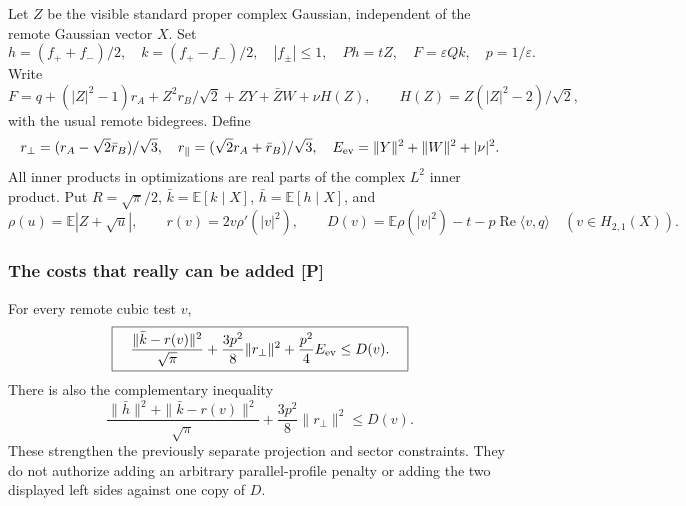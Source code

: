 Let $Z$ be the visible standard proper complex Gaussian, independent of
the remote Gaussian vector $X$. Set
\[
 h=(f_++f_-)/2,\quad k=(f_+-f_-)/2,\quad |f_\pm|\le1,
 \quad Ph=tZ,\quad F=\varepsilon Qk,\quad p=1/\varepsilon.
\]
Write
\[
 F=q+(|Z|^2-1)r_A+Z^2r_B/\sqrt2+ZY+\bar ZW+\nu H(Z),
 \qquad H(Z)=Z(|Z|^2-2)/\sqrt2,
\]
with the usual remote bidegrees. Define
\[
 r_\perp=(r_A-\sqrt2\bar r_B)/\sqrt3,\quad
 r_\parallel=(\sqrt2r_A+\bar r_B)/\sqrt3,\quad
 E_{\rm ev}=\|Y\|^2+\|W\|^2+|\nu|^2.
\]
All inner products in optimizations are real parts of the complex
$L^2$ inner product. Put $R=\sqrt\pi/2$, $\bar k=\mathbb E[k\mid X]$,
$\bar h=\mathbb E[h\mid X]$, and
\[
 \rho(u)=\mathbb E|Z+\sqrt u|,\qquad
 r(v)=2v\rho'(|v|^2),\qquad
 D(v)=\mathbb E\rho(|v|^2)-t-p\operatorname{Re}\langle v,q\rangle
 \quad(v\in H_{2,1}(X)).
\]

\subsubsection{The costs that really can be added [P]}
For every remote cubic test $v$,
\begin{equation}\label{eq:jrb-main}
 \boxed{\quad
 \frac{\|\bar k-r(v)\|^2}{\sqrt\pi}
 +\frac{3p^2}{8}\|r_\perp\|^2+\frac{p^2}{4}E_{\rm ev}
 \le D(v).\quad}
\end{equation}
There is also the complementary inequality
\begin{equation}\label{eq:jrb-h}
 \boxed{\quad
 \frac{\|\bar h\|^2+\|\bar k-r(v)\|^2}{\sqrt\pi}
 +\frac{3p^2}{8}\|r_\perp\|^2\le D(v).\quad}
\end{equation}
These strengthen the previously separate projection and sector constraints.
They do not authorize adding an arbitrary parallel-profile penalty or
adding the two displayed left sides against one copy of $D$.

